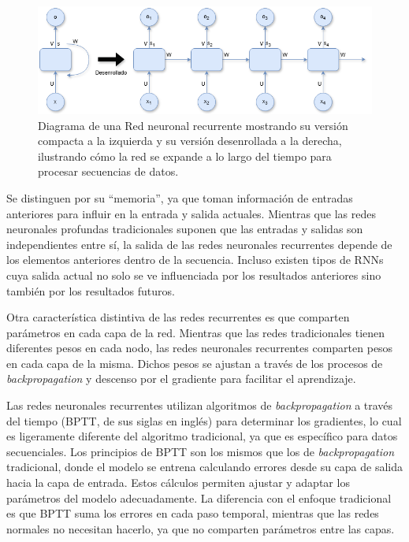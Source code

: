 \begin{figure}[H]
    \centering
    \includegraphics[width=1\textwidth]{imagenes/RNN.drawio.png}
    \caption{Diagrama de una Red neuronal recurrente mostrando su versión compacta a la izquierda y su versión desenrollada a la derecha, ilustrando cómo la red se expande a lo largo del tiempo para procesar secuencias de datos.}
    \label{fig:rnn}
\end{figure}

Se distinguen por su “memoria”, ya que toman información de entradas anteriores para influir en la entrada y salida actuales. Mientras que las redes neuronales profundas tradicionales suponen que las entradas y salidas son independientes entre sí, la salida de las redes neuronales recurrentes depende de los elementos anteriores dentro de la secuencia. Incluso existen tipos de RNNs cuya salida actual no solo se ve influenciada por los resultados anteriores sino también por los resultados futuros.

Otra característica distintiva de las redes recurrentes es que comparten parámetros en cada capa de la red. Mientras que las redes tradicionales tienen diferentes pesos en cada nodo, las redes neuronales recurrentes comparten pesos en cada capa de la misma. Dichos pesos se ajustan a través de los procesos de \textit{backpropagation} y descenso por el gradiente para facilitar el aprendizaje.

Las redes neuronales recurrentes utilizan algoritmos de \textit{backpropagation} a través del tiempo (BPTT, de sus siglas en inglés) para determinar los gradientes, lo cual es ligeramente diferente del algoritmo tradicional, ya que es específico para datos secuenciales. Los principios de BPTT son los mismos que los de \textit{backpropagation} tradicional, donde el modelo se entrena calculando errores desde su capa de salida hacia la capa de entrada. Estos cálculos permiten ajustar y adaptar los parámetros del modelo adecuadamente. La diferencia con el enfoque tradicional es que BPTT suma los errores en cada paso temporal, mientras que las redes normales no necesitan hacerlo, ya que no comparten parámetros entre las capas.

